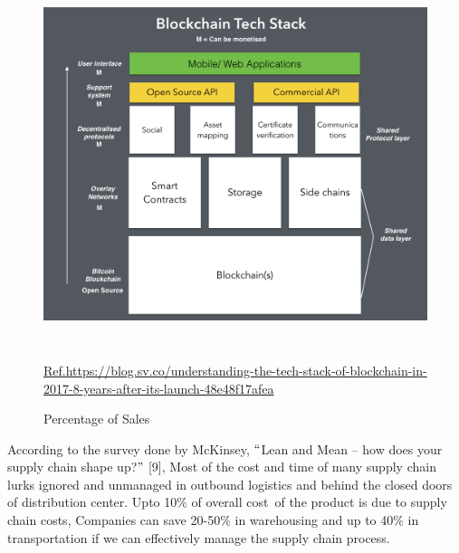 \documentclass[12pt]{article}
\begin{document}

\begin{figure}[H]
	\begin{Center}
		\includegraphics[width=6.01in,height=4.17in]{.//media/3.png}
		\caption{Percentage of Sales}
		\href{https://blog.sv.co/understanding-the-tech-stack-of-blockchain-in-2017-8-years-after-its-launch-48e48f17afea}{Ref.https://blog.sv.co/understanding-the-tech-stack-of-blockchain-in-2017-8-years-after-its-launch-48e48f17afea}
	\end{Center}
\end{figure}



{\fontsize{14pt}{16.8pt}\selectfont According to the survey done by McKinsey, $``$Lean and Mean – how does your supply chain shape up?$"$ [9], Most of the cost and time of many supply chain lurks ignored and unmanaged in outbound logistics and behind the closed doors of distribution center. Upto 10$\%$  of overall cost\  of the product is due to supply chain costs, Companies can save 20-50$\%$  in warehousing and up to 40$\%$  in transportation if we can effectively manage the supply chain process.\par}\par


\vspace{\baselineskip}
\end{document}
